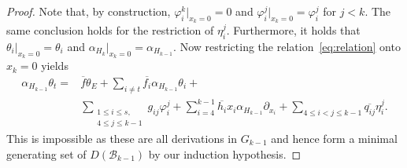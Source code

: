 \documentclass[10pt,a4paper]{amsart}
\def\A{{\mathcal{A}}}%
\def\B{{\mathcal{B}}}%
\begin{document}
\begin{proof}
Note that, by construction, $\varphi_i^k|_{x_k=0}=0$  and $\varphi_i^j|_{x_k=0}=\varphi_i^j$ for $j<k$.
The same conclusion holds for the restriction of $\eta_i^j$.
 Furthermore, it holds that $\theta_i|_{x_k=0}=\theta_i$ and $\alpha_{H_k}|_{x_k=0}=\alpha_{H_{k-1}}$.
 Now restricting the relation~\eqref{eq:relation} onto $x_k=0$ yields
 \begin{align*}
 		\alpha_{H_{k-1}}\theta_t=&\overline{f} \theta_E+\sum_{i\neq t} \overline{f_i} \alpha_{H_{k-1}} \theta_i+\\
 	&\sum_{\substack{1\le i \le s, \\4\le j \le k-1}}g_{ij} \varphi_i^j+\sum_{i=4}^{k-1} \overline{h_{i}} x_i\alpha_{H_{k-1}} \partial_{x_i}+
 	\sum_{4\le i < j \le k-1} \overline{q_{ij}}\eta_i^j.
 \end{align*}
 This is impossible as these are all derivations in $G_{k-1}$ and hence form a minimal generating set of $D(\B_{k-1})$ by our induction hypothesis.
\end{proof}
\end{document}
